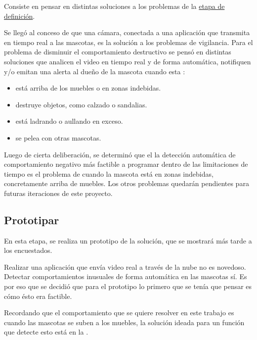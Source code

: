 Consiste en pensar en distintas soluciones a los problemas de la \hyperref[sec:definir]{etapa de definición}.

Se llegó al conceso de que una cámara, conectada a una aplicación que transmita en tiempo real a las mascotas, es la solución a los problemas de vigilancia. Para el problema de disminuir el comportamiento destructivo se pensó en distintas soluciones que analicen el video en tiempo real y de forma automática, notifiquen y/o emitan una alerta al dueño de la mascota cuando esta :

\begin{itemize}
  \item está arriba de los muebles o en zonas indebidas.
  \item destruye objetos, como calzado o sandalias.
  \item está ladrando o aullando en exceso.
  \item se pelea con otras mascotas.
\end{itemize}

Luego de cierta deliberación, se determinó que el la detección automática de  comportamiento negativo más factible a programar dentro de las limitaciones de tiempo es el problema de cuando la mascota está en zonas indebidas, concretamente arriba de muebles. Los otros problemas quedarán pendientes para futuras iteraciones de este proyecto.

\subsection{Prototipar}

En esta etapa, se realiza un prototipo de la solución, que se mostrará más tarde a los encuestados.

Realizar una aplicación que envía video real a través de la nube no es novedoso. Detectar comportamientos inusuales de forma automática en las mascotas sí. Es por eso que se decidió que para el prototipo lo primero que se tenía que pensar es cómo ésto era factible. 

Recordando que el comportamiento que se quiere resolver en este trabajo es cuando las mascotas se suben a los muebles, la solución ideada para un función que detecte esto está en la .


